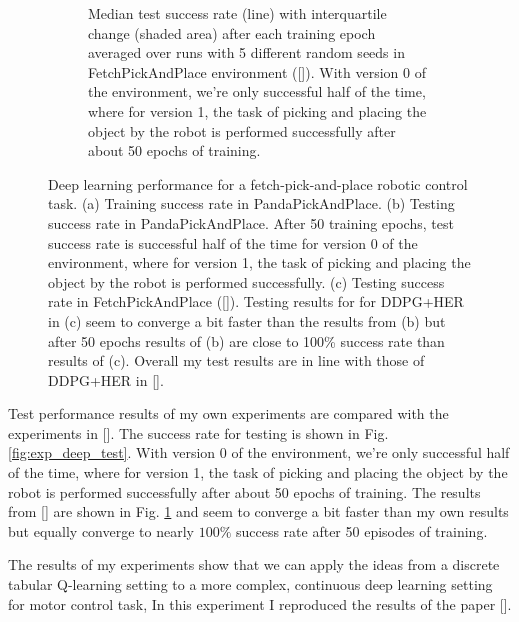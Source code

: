 \documentclass[conference]{IEEEtran}
\begin{document}
\begin{figure}[ht]
\begin{subfigure}[t]{0.30\textwidth}
\caption{Median test success rate (line) with interquartile change (shaded area) after each training epoch averaged over runs with 5 different random seeds in FetchPickAndPlace environment ([\cite{plappert2018multi}]). With version 0 of the environment, we're only successful half of the time, where for version 1, the task of picking and placing the object by the robot is performed successfully after about 50 epochs of training.}
\label{fig:exp_deep_test_plappert}
\end{subfigure}
\caption{Deep learning performance for a fetch-pick-and-place robotic control task. (a) Training success rate in PandaPickAndPlace. (b) Testing success rate in PandaPickAndPlace. After 50 training epochs, test success rate is successful half of the time for version 0 of the environment, where for version 1, the task of picking and placing the object by the robot is performed successfully. (c) Testing success rate in FetchPickAndPlace ([\cite{plappert2018multi}]). Testing results for for DDPG+HER in (c) seem to converge a bit faster than the results from (b) but after 50 epochs results of (b) are close to 100\% success rate than results of (c). Overall my test results are in line with those of DDPG+HER in [\cite{plappert2018multi}].}
\label{fig:exp_deep_perf}
\end{figure}

Test performance results of my own experiments are compared with the experiments in [\cite{plappert2018multi}]. The success rate for testing is shown in Fig. \ref{fig:exp_deep_test}. With version 0 of the environment, we're only successful half of the time, where for version 1, the task of picking and placing the object by the robot is performed successfully after about 50 epochs of training. The results from [\cite{plappert2018multi}] are shown in Fig. \ref{fig:exp_deep_test_plappert} and seem to converge a bit faster than my own results but equally converge to nearly $100\%$ success rate after 50 episodes of training.

The results of my experiments show that we can apply the ideas from a discrete tabular Q-learning setting to a more complex, continuous deep learning setting for motor control task, In this experiment I reproduced the results of the paper [\cite{plappert2018multi}]. 
\end{document}
